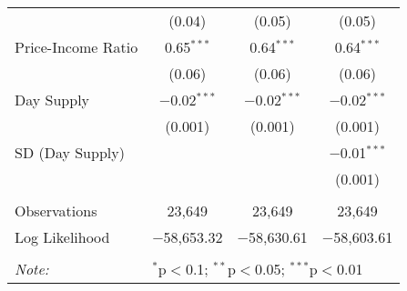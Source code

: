 \begin{table}[!htbp]
\begin{tabular}{@{\extracolsep{5pt}}lccc}
  & (0.04) & (0.05) & (0.05) \\
 Price-Income Ratio & 0.65$^{***}$ & 0.64$^{***}$ & 0.64$^{***}$ \\
  & (0.06) & (0.06) & (0.06) \\
 Day Supply & $-$0.02$^{***}$ & $-$0.02$^{***}$ & $-$0.02$^{***}$ \\
  & (0.001) & (0.001) & (0.001) \\
 SD (Day Supply) &  &  & $-$0.01$^{***}$ \\
  &  &  & (0.001) \\
\hline \\[-1.8ex]
Observations & 23,649 & 23,649 & 23,649 \\
Log Likelihood & $-$58,653.32 & $-$58,630.61 & $-$58,603.61 \\
\hline
\hline \\[-1.8ex]
\textit{Note:}  & \multicolumn{3}{l}{$^{*}$p$<$0.1; $^{**}$p$<$0.05; $^{***}$p$<$0.01} \\
\end{tabular}
\end{table}
